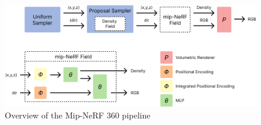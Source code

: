 \begin{figure}[!h]
    \centering
    \includegraphics[width=1.0\textwidth]{figures/mip-nerf-360-pipeline-overview.png}
    \caption{Overview of the Mip-NeRF 360 \cite{barron_mip-nerf_2022} pipeline}
    \label{fig:mip-nerf-360-pipeline-overview}
\end{figure}